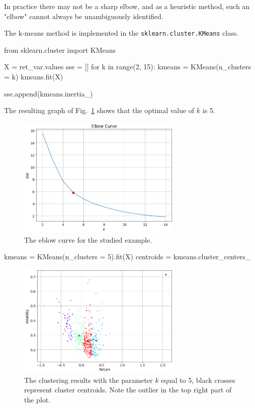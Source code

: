 In practice there may not be a sharp elbow, and as a heuristic method, such an "elbow" cannot always be unambiguously identified.

The k-means method is implemented in the \texttt{sklearn.cluster.KMeans} class.

\begin{ipython} 
from sklearn.cluster import KMeans
 
X =  ret_var.values 
sse = []
for k in range(2, 15):
    kmeans = KMeans(n_clusters = k)
    kmeans.fit(X)
   
    sse.append(kmeans.inertia_) 
\end{ipython}
 
The resulting graph of Fig.~\ref{fig:elbow_curve} shows that the optimal value of $k$ is 5.

\begin{figure}
\centering
\includegraphics[width=0.7\textwidth]{figures/elbow_curve}
\caption{The eblow curve for the studied example.}
\label{fig:elbow_curve}
\end{figure}

\begin{ipython} 
kmeans = KMeans(n_clusters = 5).fit(X)
centroids = kmeans.cluster_centers_
\end{ipython}

\begin{figure}
\centering
\includegraphics[width=0.7\textwidth]{figures/k_means_5}
\caption{The clustering results with the parameter $k$ equal to 5, black crosses represent cluster centroids. Note the outlier in the top right part of the plot.}
\label{fig:K_means_5}
\end{figure}
 
